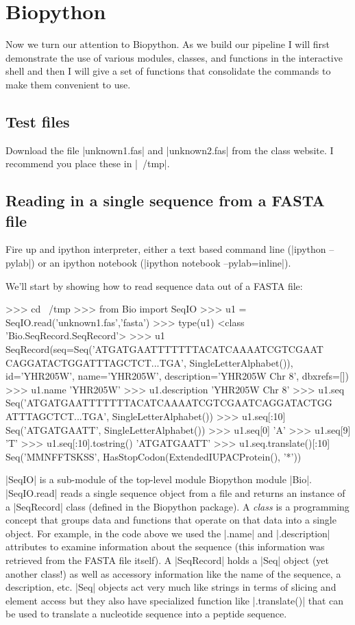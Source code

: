 \section{Biopython}

Now we turn our attention to Biopython.  As we build our pipeline I will first demonstrate the use of various modules, classes, and functions in the interactive shell and then I will give a set of functions that consolidate the commands to make them convenient to use.

\subsection{Test files}

Download the file |unknown1.fas| and |unknown2.fas| from the class website. I recommend you place these in |~/tmp|.

\subsection{Reading in a single sequence from a FASTA file}

Fire up and ipython interpreter, either a text based command line (|ipython --pylab|) or an ipython notebook (|ipython notebook --pylab=inline|).


We'll start by showing how to read sequence data out of a FASTA file:
\begin{python}
>>> cd ~/tmp
>>> from Bio import SeqIO
>>> u1 = SeqIO.read('unknown1.fas','fasta')
>>> type(u1)
<class 'Bio.SeqRecord.SeqRecord'>
>>> u1
SeqRecord(seq=Seq('ATGATGAATTTTTTTACATCAAAATCGTCGAAT
CAGGATACTGGATTTAGCTCT...TGA', SingleLetterAlphabet()),
id='YHR205W', name='YHR205W', description='YHR205W  Chr 8', dbxrefs=[])
>>> u1.name
'YHR205W'
>>> u1.description
'YHR205W  Chr 8'
>>> u1.seq
Seq('ATGATGAATTTTTTTACATCAAAATCGTCGAATCAGGATACTGG
ATTTAGCTCT...TGA', SingleLetterAlphabet())
>>> u1.seq[:10]
Seq('ATGATGAATT', SingleLetterAlphabet())
>>> u1.seq[0]
'A'
>>> u1.seq[9]
'T'
>>> u1.seq[:10].tostring()
'ATGATGAATT'
>>> u1.seq.translate()[:10]
Seq('MMNFFTSKSS', HasStopCodon(ExtendedIUPACProtein(), '*'))
\end{python}

|SeqIO| is a sub-module of the top-level module Biopython module |Bio|.  |SeqIO.read| reads a single sequence object from a file and returns an instance of a |SeqRecord| class (defined in the Biopython package). A \emph{class} is a programming concept that groups data and functions that operate on that data into a single object. For example, in the code above we used the |.name| and |.description| attributes to examine information about the sequence (this information was retrieved from the FASTA file itself).  A |SeqRecord| holds a |Seq| object (yet another class!) as well as accessory information like the name of the sequence, a description, etc. |Seq| objects act very much like strings in terms of slicing and element access but they also have specialized function like |.translate()| that can be used to translate a nucleotide sequence into a peptide sequence.


